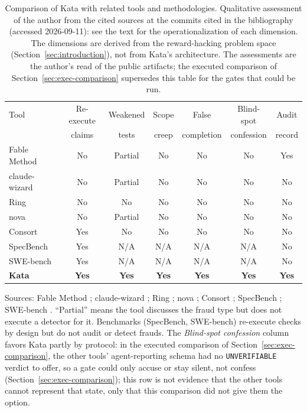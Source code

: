 \documentclass[11pt]{article}
\begin{document}
\begin{table}[!ht]
\caption{Comparison of Kata with related tools and methodologies.
Qualitative assessment of the author from the cited sources at the commits
cited in the bibliography (accessed 2026-09-11): see the text for the
operationalization of each dimension. The dimensions are derived from the
reward-hacking problem space (Section~\ref{sec:introduction}), not from
Kata's architecture. The assessments are the author's
read of the public artifacts; the executed comparison of
Section~\ref{sec:exec-comparison} supersedes this table for the gates that
could be run.}
\centering
\footnotesize
\begin{tabular}{@{}lcccccc@{}}
\toprule
Tool & Re-execute & Weakened & Scope & False & Blind-spot & Audit \\
 & claims & tests & creep & completion & confession & record \\
\midrule
Fable Method \cite{fable} & No & Partial & No & No & No & Yes \\
claude-wizard \cite{claudewizard} & No & Partial & No & No & No & No \\
Ring \cite{ring} & No & No & No & No & No & No \\
nova \cite{nova} & No & Partial & No & No & No & No \\
Consort \cite{consort} & Yes & No & No & No & No & No \\
SpecBench \cite{specbench} & Yes & N/A & N/A & N/A & N/A & No \\
SWE-bench \cite{swebench} & Yes & N/A & N/A & N/A & N/A & No \\
\textbf{Kata} & \textbf{Yes} & \textbf{Yes} & \textbf{Yes} & \textbf{Yes} & \textbf{Yes} & \textbf{Yes} \\
\bottomrule
\end{tabular}
\par\smallskip
{\footnotesize Sources: Fable Method \cite{fable}; claude-wizard \cite{claudewizard}; Ring \cite{ring}; nova \cite{nova}; Consort \cite{consort}; SpecBench \cite{specbench}; SWE-bench \cite{swebench}. ``Partial'' means the tool discusses the fraud type but does not execute a detector for it. Benchmarks (SpecBench, SWE-bench) re-execute checks by design but do not audit or detect frauds. The \emph{Blind-spot confession} column favors Kata partly by protocol: in the executed comparison of Section~\ref{sec:exec-comparison}, the other tools' agent-reporting schema had no \texttt{UNVERIFIABLE} verdict to offer, so a gate could only accuse or stay silent, not confess (Section~\ref{sec:exec-comparison}); this row is not evidence that the other tools cannot represent that state, only that this comparison did not give them the option.}
\label{tab:comparison}
\end{table}
\end{document}
